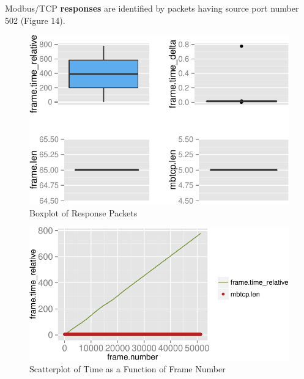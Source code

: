 \documentclass[11pt,]{article}
\begin{document}
Modbus/TCP \textbf{responses} are identified by packets having source
port number 502 (Figure 14).

\begin{figure}[bottom]

{\centering \includegraphics{thesis_files/figure-latex/unnamed-chunk-25-1} 

}

\caption{Boxplot of Response Packets}\label{fig:unnamed-chunk-25}
\end{figure}

\clearpage

\begin{figure}

{\centering \includegraphics{thesis_files/figure-latex/unnamed-chunk-26-1} 

}

\caption{Scatterplot of Time as a Function of Frame Number}\label{fig:unnamed-chunk-26}
\end{figure}
\end{document}
